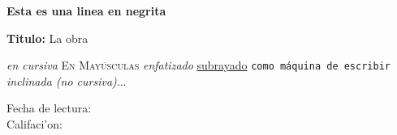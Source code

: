 \bfseries Esta es una linea en negrita

{\bfseries Titulo:} La obra


\textit{en cursiva}
\textsc{En Mayúsculas}
\emph{enfatizado}
\underline{subrayado}
\texttt{como máquina de escribir}
\textsl{inclinada (no cursiva)}...



\vspace{2cm}

\hspace{2cm}

\raggedright
\raggedleft
\centering

\indent
\noindent

\vfill

\begin{doublespace}
  Fecha de lectura:\\
  Califaci'on:
\end{doublespace}

\newpage
\thispagestyle{empty}
\mbox{}

\usepackage{emptypage}
\cleardoublepage
